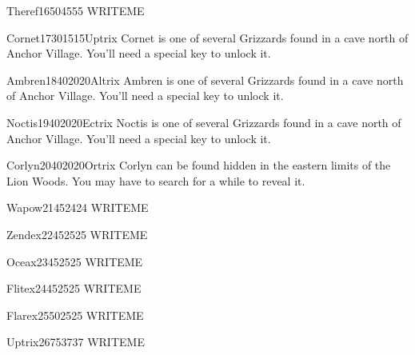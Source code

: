 \documentclass[10pt,twocolumn]{memoir}
\begin{document}
\begin{grizzardpage}{Theref}{16}{50}{45}{55}{}
  WRITEME
\end{grizzardpage}

\begin{grizzardpage}{Cornet}{17}{30}{15}{15}{Uptrix}
  Cornet is  one of several  Grizzards found in  a cave north  of Anchor
  Village. You'll need a special key to unlock it.
\end{grizzardpage}

\begin{grizzardpage}{Ambren}{18}{40}{20}{20}{Altrix}
  Ambren is  one of several  Grizzards found in  a cave north  of Anchor
  Village. You'll need a special key to unlock it.
\end{grizzardpage}

\begin{grizzardpage}{Noctis}{19}{40}{20}{20}{Ectrix}
  Noctis is  one of several  Grizzards found in  a cave north  of Anchor
  Village. You'll need a special key to unlock it.
\end{grizzardpage}

\begin{grizzardpage}{Corlyn}{20}{40}{20}{20}{Ortrix}
  Corlyn can  be found hidden in  the eastern limits of  the Lion Woods.
  You may have to search for a while to reveal it.
\end{grizzardpage}

\begin{grizzardpage}{Wapow}{21}{45}{24}{24}{}
  WRITEME
\end{grizzardpage}

\begin{grizzardpage}{Zendex}{22}{45}{25}{25}{}
  WRITEME
\end{grizzardpage}

\begin{grizzardpage}{Oceax}{23}{45}{25}{25}{}
  WRITEME
\end{grizzardpage}

\begin{grizzardpage}{Flitex}{24}{45}{25}{25}{}
  WRITEME
\end{grizzardpage}

\begin{grizzardpage}{Flarex}{25}{50}{25}{25}{}
  WRITEME
\end{grizzardpage}

\begin{grizzardpage}{Uptrix}{26}{75}{37}{37}{}
  WRITEME
\end{grizzardpage}
\end{document}
